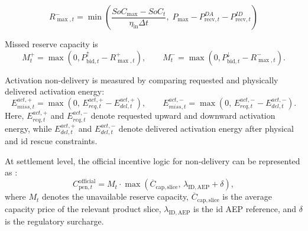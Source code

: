 \begin{equation}\label{eq:rmax-neg}
    R^{-}_{\max,t}
    =
    \min\!\left(
    \frac{SoC_{\max}-SoC_t}{\eta_{\text{in}}\Delta t},
    \;
    P_{\text{max}}-P^{DA}_{\mathrm{recv},t}-P^{ID}_{\mathrm{recv},t}
    \right)
\end{equation}

Missed reserve capacity is
\begin{equation}\label{eq:missed-cap}
    M^{+}_{t}=\max\!\left(0, P_{\text{bid},t}^{\uparrow}-R^{+}_{\max,t}\right),
    \qquad
    M^{-}_{t}=\max\!\left(0, P_{\text{bid},t}^{\downarrow}-R^{-}_{\max,t}\right).
\end{equation}

Activation non-delivery is measured by comparing requested and physically delivered activation energy:
\begin{equation}\label{eq:missed-activation}
    E^{act,+}_{miss,t}=\max\!\left(0,\,E^{act,+}_{req,t}-E^{act,+}_{del,t}\right),
    \qquad
    E^{act,-}_{miss,t}=\max\!\left(0,\,E^{act,-}_{req,t}-E^{act,-}_{del,t}\right).
\end{equation}
Here, $E^{act,+}_{req,t}$ and $E^{act,-}_{req,t}$ denote requested upward and downward activation energy, while $E^{act,+}_{del,t}$ and $E^{act,-}_{del,t}$ denote delivered activation energy after physical and \gls{id} rescue constraints.

At settlement level, the official incentive logic for non-delivery can be represented as \citep{Regelleistung.net2026}:
\begin{equation}\label{eq:cpen-official}
    C^{\mathrm{official}}_{\mathrm{pen},t}
    =
    M_t \cdot \max\!\left(\overline{C}_{\mathrm{cap, slice}},\, \lambda_{\mathrm{ID, AEP}} + \delta\right),
\end{equation}
where $M_t$ denotes the unavailable reserve capacity, $\overline{C}_{\mathrm{cap, slice}}$ is the average capacity price of the relevant product slice, $\lambda_{\mathrm{ID, AEP}}$ is the \gls{id} AEP reference, and $\delta$ is the regulatory surcharge.

